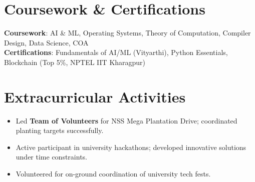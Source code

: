 \documentclass[letterpaper,11pt]{article}
\newcommand{\resumeItem}[1]{
  \item\small{
    {#1 \vspace{-3pt}}
  }
}
\newcommand{\resumeSubHeadingListStart}{\begin{itemize}[leftmargin=0.15in, label={}]}
\newcommand{\resumeSubHeadingListEnd}{\end{itemize}}
\begin{document}
\section{Coursework \& Certifications}
 \begin{itemize}[leftmargin=0.15in, label={}]
    \small{\item{
     \textbf{Coursework}{: AI \& ML, Operating Systems, Theory of Computation, Compiler Design, Data Science, COA} \\
     \textbf{Certifications}{: Fundamentals of AI/ML (Vityarthi), Python Essentials, Blockchain (Top 5\%, NPTEL IIT Kharagpur)}
    }}
 \end{itemize}

\section{Extracurricular Activities}
  \resumeSubHeadingListStart
    \resumeItem{Led \textbf{Team of Volunteers} for NSS Mega Plantation Drive; coordinated planting targets successfully.}
    \resumeItem{Active participant in university hackathons; developed innovative solutions under time constraints.}
    \resumeItem{Volunteered for on-ground coordination of university tech fests.}
  \resumeSubHeadingListEnd

\end{document}
